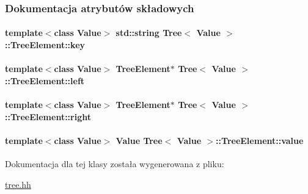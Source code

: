 \subsubsection{Dokumentacja atrybutów składowych}
\hypertarget{class_tree_1_1_tree_element_a83a5553092226a5cd9007eff6af6772c}{
\paragraph[{key}]{\setlength{\rightskip}{0pt plus 5cm}template$<$class Value$>$ std\-::string {\bf Tree}$<$ Value $>$\-::Tree\-Element\-::key}}\label{class_tree_1_1_tree_element_a83a5553092226a5cd9007eff6af6772c}
\hypertarget{class_tree_1_1_tree_element_a1af0675a9954c755d951479025115dfd}{
\paragraph[{left}]{\setlength{\rightskip}{0pt plus 5cm}template$<$class Value$>$ {\bf Tree\-Element}$\ast$ {\bf Tree}$<$ Value $>$\-::Tree\-Element\-::left}}\label{class_tree_1_1_tree_element_a1af0675a9954c755d951479025115dfd}
\hypertarget{class_tree_1_1_tree_element_af32234eec45bbb63a29e02e08306a801}{
\paragraph[{right}]{\setlength{\rightskip}{0pt plus 5cm}template$<$class Value$>$ {\bf Tree\-Element}$\ast$ {\bf Tree}$<$ Value $>$\-::Tree\-Element\-::right}}\label{class_tree_1_1_tree_element_af32234eec45bbb63a29e02e08306a801}
\hypertarget{class_tree_1_1_tree_element_a816dec2d4aed4b3176f2c6179928e562}{
\paragraph[{value}]{\setlength{\rightskip}{0pt plus 5cm}template$<$class Value$>$ Value {\bf Tree}$<$ Value $>$\-::Tree\-Element\-::value}}\label{class_tree_1_1_tree_element_a816dec2d4aed4b3176f2c6179928e562}


Dokumentacja dla tej klasy została wygenerowana z pliku\-:\begin{DoxyCompactItemize}
\item 
\hyperlink{tree_8hh}{tree.\-hh}\end{DoxyCompactItemize}
